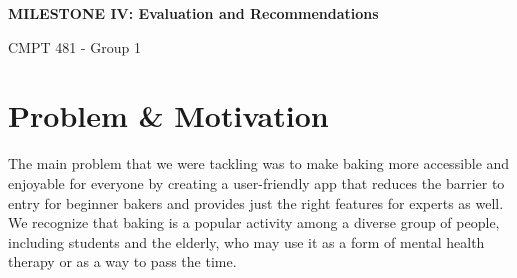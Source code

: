 \documentclass[manuscript, screen, nonacm]{acmart}
\begin{document}
  \begin{center}
       \vspace*{1cm}


        \textbf{\huge MILESTONE IV: Evaluation and Recommendations}

       \vspace{0.5cm}
        CMPT 481 - Group 1
            
       \vspace{1.5cm}


       \vfill
\end{center}



\author{Aamna Niaz}

\author{Ahmad Ghachim}

\author{Aitazaz Gilani}

\author{Minh Nguyen}

\author{Sina Khademolhosseini}



\maketitle
\thispagestyle{empty}
\newpage
\setcounter{page}{1}
\section{Problem \& Motivation}
The main problem that we were tackling was to make baking more accessible and enjoyable for everyone by creating a user-friendly app that reduces the barrier to entry for beginner bakers and provides just the right features for experts as well. We recognize that baking is a popular activity among a diverse group of people, including students and the elderly, who may use it as a form of mental health therapy or as a way to pass the time. 
\end{document}
